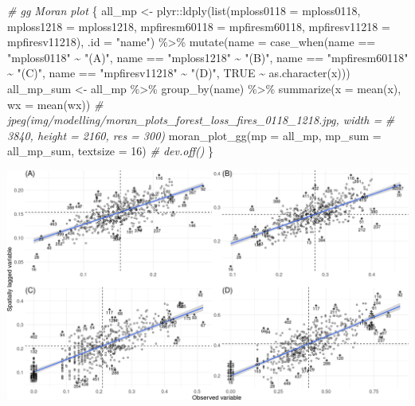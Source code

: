 \documentclass[10pt,landscape,a3paper]{article}
\newenvironment{Shaded}{\begin{snugshade}}{\end{snugshade}}
\newcommand{\AttributeTok}[1]{\textcolor[rgb]{0.77,0.63,0.00}{#1}}
\newcommand{\CommentTok}[1]{\textcolor[rgb]{0.56,0.35,0.01}{\textit{#1}}}
\newcommand{\ConstantTok}[1]{\textcolor[rgb]{0.00,0.00,0.00}{#1}}
\newcommand{\DecValTok}[1]{\textcolor[rgb]{0.00,0.00,0.81}{#1}}
\newcommand{\FunctionTok}[1]{\textcolor[rgb]{0.00,0.00,0.00}{#1}}
\newcommand{\NormalTok}[1]{#1}
\newcommand{\OtherTok}[1]{\textcolor[rgb]{0.56,0.35,0.01}{#1}}
\newcommand{\SpecialCharTok}[1]{\textcolor[rgb]{0.00,0.00,0.00}{#1}}
\newcommand{\StringTok}[1]{\textcolor[rgb]{0.31,0.60,0.02}{#1}}
\begin{document}
\begin{Shaded}
\begin{Highlighting}[]

\CommentTok{\# gg Moran plot}
\NormalTok{\{}
\NormalTok{    all\_mp }\OtherTok{\textless{}{-}}\NormalTok{ plyr}\SpecialCharTok{::}\FunctionTok{ldply}\NormalTok{(}\FunctionTok{list}\NormalTok{(}\AttributeTok{mploss0118 =}\NormalTok{ mploss0118, }\AttributeTok{mploss1218 =}\NormalTok{ mploss1218,}
        \AttributeTok{mpfiresm60118 =}\NormalTok{ mpfiresm60118, }\AttributeTok{mpfiresv11218 =}\NormalTok{ mpfiresv11218), }\AttributeTok{.id =} \StringTok{"name"}\NormalTok{) }\SpecialCharTok{\%\textgreater{}\%}
        \FunctionTok{mutate}\NormalTok{(}\AttributeTok{name =} \FunctionTok{case\_when}\NormalTok{(name }\SpecialCharTok{==} \StringTok{"mploss0118"} \SpecialCharTok{\textasciitilde{}} \StringTok{"(A)"}\NormalTok{, name }\SpecialCharTok{==} \StringTok{"mploss1218"} \SpecialCharTok{\textasciitilde{}}
            \StringTok{"(B)"}\NormalTok{, name }\SpecialCharTok{==} \StringTok{"mpfiresm60118"} \SpecialCharTok{\textasciitilde{}} \StringTok{"(C)"}\NormalTok{, name }\SpecialCharTok{==} \StringTok{"mpfiresv11218"} \SpecialCharTok{\textasciitilde{}} \StringTok{"(D)"}\NormalTok{,}
            \ConstantTok{TRUE} \SpecialCharTok{\textasciitilde{}} \FunctionTok{as.character}\NormalTok{(x)))}
\NormalTok{    all\_mp\_sum }\OtherTok{\textless{}{-}}\NormalTok{ all\_mp }\SpecialCharTok{\%\textgreater{}\%}
        \FunctionTok{group\_by}\NormalTok{(name) }\SpecialCharTok{\%\textgreater{}\%}
        \FunctionTok{summarize}\NormalTok{(}\AttributeTok{x =} \FunctionTok{mean}\NormalTok{(x), }\AttributeTok{wx =} \FunctionTok{mean}\NormalTok{(wx))}
    \CommentTok{\# jpeg(\textquotesingle{}img/modelling/moran\_plots\_forest\_loss\_fires\_0118\_1218.jpg\textquotesingle{}, width =}
    \CommentTok{\# 3840, height = 2160, res = 300)}
    \FunctionTok{moran\_plot\_gg}\NormalTok{(}\AttributeTok{mp =}\NormalTok{ all\_mp, }\AttributeTok{mp\_sum =}\NormalTok{ all\_mp\_sum, }\AttributeTok{textsize =} \DecValTok{16}\NormalTok{)}
    \CommentTok{\# dev.off()}
\NormalTok{\}}
\end{Highlighting}
\end{Shaded}

\begin{center}\includegraphics{img/modelling/lta-esda-6} \end{center}
\end{document}
